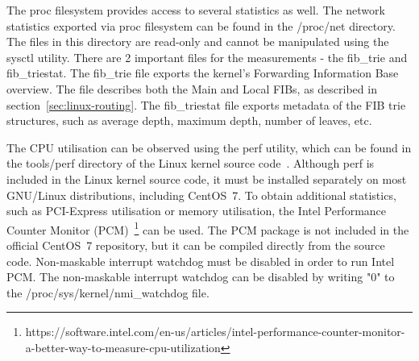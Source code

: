 The proc filesystem provides access to several statistics as well.
The network statistics exported via proc filesystem can be found in the /proc/net directory.
The files in this directory are read-only and cannot be manipulated using the sysctl utility.
There are 2 important files for the measurements - the fib\_trie and fib\_triestat.
The fib\_trie file exports the kernel's Forwarding Information Base overview.
The file describes both the Main and Local FIBs, as described in section~\ref{sec:linux-routing}.
The fib\_triestat file exports metadata of the FIB trie structures,
such as average depth, maximum depth, number of leaves, etc.

The CPU utilisation can be observed using the perf utility,
which can be found in the tools/perf directory of the Linux kernel source code~\cite{kernel-source}.
Although perf is included in the Linux kernel source code,
it must be installed separately on most GNU/Linux distributions, including CentOS~7.
To obtain additional statistics, such as PCI-Express utilisation or memory utilisation,
the Intel Performance Counter Monitor (PCM)~\footnote{https://software.intel.com/en-us/articles/intel-performance-counter-monitor-a-better-way-to-measure-cpu-utilization}
can be used.
The PCM package is not included in the official CentOS~7 repository,
but it can be compiled directly from the source code.
Non-maskable interrupt watchdog must be disabled
in order to run Intel PCM.
The non-maskable interrupt watchdog can be disabled by writing "0" to the /proc/sys/kernel/nmi\_watchdog file.
